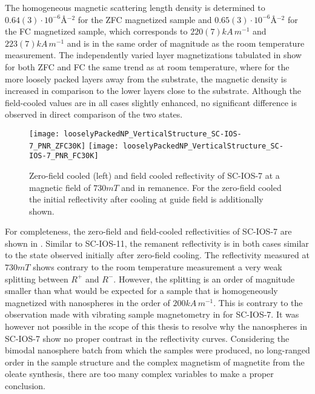 \documentclass[\main/dresen_thesis.tex]{subfiles}
\begin{document}
  The homogeneous magnetic scattering length density is determined to $0.64(3) \cdot \unit{10^{-6} \angstrom^{-2}}$ for the ZFC magnetized sample and $0.65(3) \cdot \unit{10^{-6} \angstrom^{-2}}$ for the FC magnetized sample, which corresponds to $220(7) \unit{kA \, m^{-1}}$ and $223(7) \unit{kA \, m^{-1}}$ and is in the same order of magnitude as the room temperature measurement.
  The independently varied layer magnetizations tabulated in  show for both ZFC and FC the same trend as at room temperature, where for the more loosely packed layers away from the substrate, the magnetic density is increased in comparison to the lower layers close to the substrate.
  Although the field-cooled values are in all cases slightly enhanced, no significant difference is observed in direct comparison of the two states.

  \begin{figure}[tb]
    \centering
    \texttt{[image: looselyPackedNP\_VerticalStructure\_SC-IOS-7\_PNR\_ZFC30K]}
    \texttt{[image: looselyPackedNP\_VerticalStructure\_SC-IOS-7\_PNR\_FC30K]}
    \caption{\label{fig:looselyPackedNP:layer:ZFCFCIOS7}Zero-field cooled (left) and field cooled reflectivity of SC-IOS-7 at a magnetic field of $730 \unit{mT}$ and in remanence. For the zero-field cooled the initial reflectivity after cooling at guide field is additionally shown.}
  \end{figure}

  For completeness, the zero-field and field-cooled reflectivities of SC-IOS-7 are shown in .
  Similar to SC-IOS-11, the remanent reflectivity is in both cases similar to the state observed initially after zero-field cooling.
  The reflectivity measured at $730 \unit{mT}$ shows contrary to the room temperature measurement a very weak splitting between $R^{+}$ and $R^{-}$.
  However, the splitting is an order of magnitude smaller than what would be expected for a sample that is homogeneously magnetized with nanospheres in the order of $200 \unit{kA \, m^{-1}}$.
  This is contrary to the observation made with vibrating sample magnetometry in  for SC-IOS-7.
  It was however not possible in the scope of this thesis to resolve why the nanospheres in SC-IOS-7 show no proper contrast in the reflectivity curves.
  Considering the bimodal nanosphere batch from which the samples were produced, no long-ranged order in the sample structure and the complex magnetism of magnetite from the oleate synthesis, there are too many complex variables to make a proper conclusion.
\end{document}
